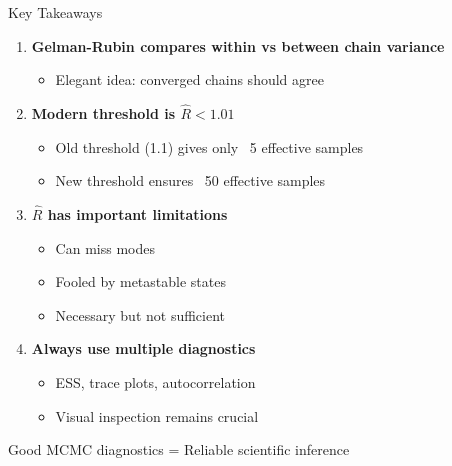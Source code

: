 \begin{frame}{Key Takeaways}
	\begin{enumerate}
		\item \textbf{Gelman-Rubin compares within vs between chain variance}
		      \begin{itemize}
			      \item Elegant idea: converged chains should agree
		      \end{itemize}

		\item \textbf{Modern threshold is $\hat{R} < 1.01$}
		      \begin{itemize}
			      \item Old threshold (1.1) gives only ~5 effective samples
			      \item New threshold ensures ~50 effective samples
		      \end{itemize}

		\item \textbf{$\hat{R}$ has important limitations}
		      \begin{itemize}
			      \item Can miss modes
			      \item Fooled by metastable states
			      \item Necessary but not sufficient
		      \end{itemize}

		\item \textbf{Always use multiple diagnostics}
		      \begin{itemize}
			      \item ESS, trace plots, autocorrelation
			      \item Visual inspection remains crucial
		      \end{itemize}
	\end{enumerate}

	\vspace{0.5cm}
	\begin{center}
		\Large \color{copenhagenred}
		Good MCMC diagnostics = Reliable scientific inference
	\end{center}
\end{frame}


